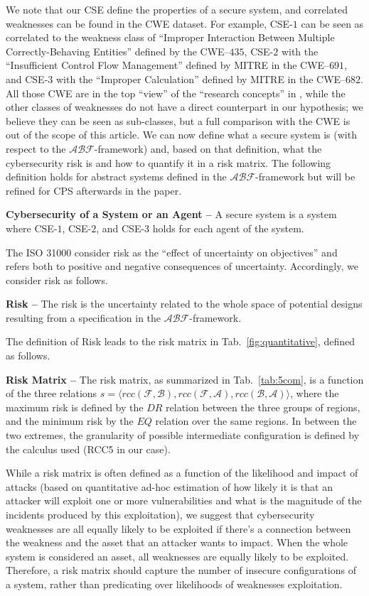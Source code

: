 \documentclass[runningheads]{llncs}
\newcommand{\assertionRegion}{\mathcal{A}}
\newcommand{\beliefRegion}{\mathcal{B}}
\newcommand{\factRegion}{\mathcal{F}}
\newcommand{\rcc}{rcc}
\newcommand{\abftheory}{\assertionRegion\beliefRegion\factRegion}
\begin{document}
We note that our CSE define the properties of a secure system, and correlated
weaknesses can be found in the CWE dataset.  For example, CSE-$1$ can be seen as
correlated to the weakness class of ``Improper Interaction Between Multiple
Correctly-Behaving Entities'' defined by the CWE--$435$, CSE-$2$ with the
``Insufficient Control Flow Management'' defined by MITRE in the CWE--$691$,
and CSE-$3$ with the ``Improper Calculation'' defined by MITRE in the
CWE--$682$. All those CWE are in the top ``view'' of the ``research concepts''
in \autocite{MITRE2020CWEresearch}, while the other classes of weaknesses do not
have a direct counterpart in our hypothesis; we believe they can be seen as sub-classes,
but a full comparison with the CWE is out of the scope of this article.
We can now define what a secure system is (with respect to
the $\abftheory$-framework) and, based on that definition, what the cybersecurity risk is and
how to quantify it in a risk matrix. The following definition holds for 
abstract systems defined in the $\abftheory$-framework but will be refined
for CPS afterwards in the paper.
\begin{definition}{\bf Cybersecurity of a System or an Agent --}\label{def:security}
	A secure system is a system where CSE-$1$, CSE-$2$, and CSE-$3$ holds for
	each agent of the system.
\end{definition}
The ISO 31000 consider risk as the ``effect of uncertainty on objectives'' and
refers both to positive and negative consequences of uncertainty.
Accordingly, we consider risk as follows.
\begin{definition}{\bf Risk --}
The risk is the uncertainty related to the whole space of potential designs
	resulting from a specification in the $\abftheory$-framework.
\end{definition}
The definition of Risk leads to the risk matrix in
Tab.~\ref{fig:quantitative}, defined as follows.
\begin{definition}{\bf Risk Matrix --}
	The risk matrix, as summarized in Tab.~\ref{tab:5com}, is a function of the three relations
	$s=\langle\rcc(\factRegion,\beliefRegion),\rcc(\factRegion,\assertionRegion),\rcc(\beliefRegion,\assertionRegion)\rangle$,
	where the maximum risk is defined by the $DR$ relation between the
	three groups of regions, and the minimum risk by the $EQ$ relation over
	the same regions. In between the two extremes, the granularity of
	possible intermediate configuration is defined by the calculus used
	(RCC5 in our case).
\end{definition}
While a risk matrix is often defined as a function of the likelihood and impact
of attacks (based on quantitative ad-hoc estimation of how likely it is that an
attacker will exploit one or more vulnerabilities and what is the magnitude of
the incidents produced by this exploitation), we suggest that cybersecurity
weaknesses are all equally likely to be exploited if there's a connection
between the weakness and the asset that an attacker wants to impact. When the
whole system is considered an asset, all weaknesses are equally likely to be
exploited.  Therefore, a risk matrix should capture the number of insecure
configurations of a system, rather than predicating over likelihoods of
weaknesses exploitation.
\end{document}
